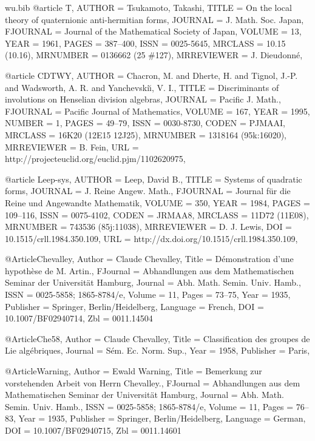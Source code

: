 \documentclass{amsart}
\numberwithin{equation}{section}
\theoremstyle{plain}
\theoremstyle{definition}
\begin{document}
\begin{filecontents}{wu.bib}
@article {T, 
    AUTHOR = {Tsukamoto, Takashi},
     TITLE = {On the local theory of quaternionic anti-hermitian forms},
   JOURNAL = {J. Math. Soc. Japan},
  FJOURNAL = {Journal of the Mathematical Society of Japan},
    VOLUME = {13},
      YEAR = {1961},
     PAGES = {387--400},
      ISSN = {0025-5645},
   MRCLASS = {10.15 (10.16)},
  MRNUMBER = {0136662 (25 \#127)},
MRREVIEWER = {J. Dieudonn{\'e}},
}

@article {CDTWY,
    AUTHOR = {Chacron, M. and Dherte, H. and Tignol, J.-P. and Wadsworth, A.
              R. and Yanchevski{\u\i}, V. I.},
     TITLE = {Discriminants of involutions on {H}enselian division algebras},
   JOURNAL = {Pacific J. Math.},
  FJOURNAL = {Pacific Journal of Mathematics},
    VOLUME = {167},
      YEAR = {1995},
    NUMBER = {1},
     PAGES = {49--79},
      ISSN = {0030-8730},
     CODEN = {PJMAAI},
   MRCLASS = {16K20 (12E15 12J25)},
  MRNUMBER = {1318164 (95k:16020)},
MRREVIEWER = {B. Fein},
       URL = {http://projecteuclid.org/euclid.pjm/1102620975},
}

@article {Leep-sys,
    AUTHOR = {Leep, David B.},
     TITLE = {Systems of quadratic forms},
   JOURNAL = {J. Reine Angew. Math.},
  FJOURNAL = {Journal f\"ur die Reine und Angewandte Mathematik},
    VOLUME = {350},
      YEAR = {1984},
     PAGES = {109--116},
      ISSN = {0075-4102},
     CODEN = {JRMAA8},
   MRCLASS = {11D72 (11E08)},
  MRNUMBER = {743536 (85j:11038)},
MRREVIEWER = {D. J. Lewis},
       DOI = {10.1515/crll.1984.350.109},
       URL = {http://dx.doi.org/10.1515/crll.1984.350.109},
}

@Article{Chevalley,
    Author = {Claude {Chevalley}},
    Title = {{D\'emonstration d'une hypoth\`ese de M. Artin.}},
    FJournal = {{Abhandlungen aus dem Mathematischen Seminar der Universit\"at Hamburg}},
    Journal = {{Abh. Math. Semin. Univ. Hamb.}},
    ISSN = {0025-5858; 1865-8784/e},
    Volume = {11},
    Pages = {73--75},
    Year = {1935},
    Publisher = {Springer, Berlin/Heidelberg},
    Language = {French},
    DOI = {10.1007/BF02940714},
    Zbl = {0011.14504}
}

@Article{Che58,
	Author = {Claude {Chevalley}},
	Title = {{Classification des groupes de Lie alg\'ebriques}},
	Journal = {{S\'em. Ec. Norm. Sup.}},
	Year = {1958},
	Publisher = {Paris},
}

@Article{Warning,
    Author = {Ewald {Warning}},
    Title = {{Bemerkung zur vorstehenden Arbeit von Herrn Chevalley.}},
    FJournal = {{Abhandlungen aus dem Mathematischen Seminar der Universit\"at Hamburg}},
    Journal = {{Abh. Math. Semin. Univ. Hamb.}},
    ISSN = {0025-5858; 1865-8784/e},
    Volume = {11},
    Pages = {76--83},
    Year = {1935},
    Publisher = {Springer, Berlin/Heidelberg},
    Language = {German},
    DOI = {10.1007/BF02940715},
    Zbl = {0011.14601}
}


\end{filecontents}
\end{document}
